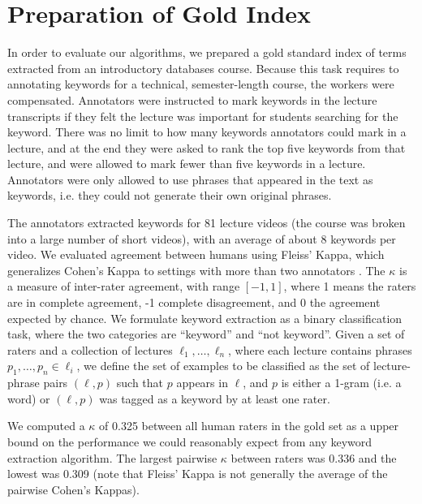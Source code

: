 \section{Preparation of Gold Index}
\label{sec:gold}


In order to evaluate our algorithms, we prepared a gold standard index of terms extracted from an introductory databases course. Because this task requires to annotating keywords for a technical, semester-length course, the workers were compensated. Annotators were instructed to mark keywords in the lecture transcripts if they felt the lecture was important for students searching for the keyword. There was no limit to how many keywords annotators could mark in a lecture, and at the end they were asked to rank the top five keywords from that lecture, and were allowed to mark fewer than five keywords in a lecture. Annotators were only allowed to use phrases that appeared in the text as keywords, i.e. they could not generate their own original phrases.

The annotators extracted keywords for 81 lecture videos (the course was broken into a large number of short videos), with an average of about 8 keywords per video. We evaluated agreement between humans using Fleiss' Kappa, which generalizes Cohen's Kappa to settings with more than two annotators \cite{fleiss1971measuring}. The $\kappa$ is a measure of inter-rater agreement, with range $[-1, 1]$, where 1 means the raters are in complete agreement, -1 complete disagreement, and 0 the agreement expected by chance. We formulate keyword extraction as a binary classification task, where the two categories are ``keyword'' and ``not keyword''. Given a set of raters and a collection of lectures $\ell_1, \ldots, \ell_n$, where each lecture contains phrases $p_1, \ldots, p_n \in \ell_i$, we define the set of examples to be classified as the set of lecture-phrase pairs $(\ell, p)$ such that $p$ appears in $\ell$, and $p$ is either a 1-gram (i.e. a word) or $(\ell, p)$ was tagged as a keyword by at least one rater.

We computed a $\kappa$ of 0.325 between all human raters in the gold set as a upper bound on the performance we could reasonably expect from any keyword extraction algorithm. The largest pairwise $\kappa$ between raters was 0.336 and the lowest was 0.309 (note that Fleiss' Kappa is not generally the average of the pairwise Cohen's Kappas).

